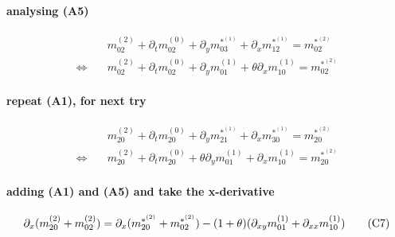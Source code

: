 \documentclass{article}
\begin{document}
  \paragraph{analysing (A5)}
  \begin{align*}
    &
    m_{02}^{(2)} + \partial_t m_{02}^{(0)} + \partial_y m_{03}^{*^{(1)}} + \partial_x m_{12}^{*^{(1)}} = m_{02}^{*^{(2)}}
    \\ \Leftrightarrow\quad &
    m_{02}^{(2)} + \partial_t m_{02}^{(0)} + \partial_y m_{01}^{(1)} + \theta\partial_x m_{10}^{(1)} = m_{02}^{*^{(2)}}
  \end{align*}

  \paragraph{repeat (A1), for next try}
  \begin{align*}
    &
    m_{20}^{(2)} + \partial_t m_{20}^{(0)} + \partial_y m_{21}^{*^{(1)}} + \partial_x m_{30}^{*^{(1)}} = m_{20}^{*^{(2)}}
    \\ \Leftrightarrow\quad &
    m_{20}^{(2)} + \partial_t m_{20}^{(0)} + \theta\partial_y m_{01}^{(1)} + \partial_x m_{10}^{(1)} = m_{20}^{*^{(2)}}
  \end{align*}

  \paragraph{adding (A1) and (A5) and take the x-derivative}
  \begin{equation}
    \partial_x (m_{20}^{(2)} + m_{02}^{(2)}) =\partial_x (m_{20}^{*^{(2)}} + m_{02}^{*^{(2)}}) - (1+\theta)(\partial_{xy} m_{01}^{(1)} + \partial_{xx} m_{10}^{(1)})  \tag{C7} \\
  \end{equation}

  \pagebreak
\end{document}
